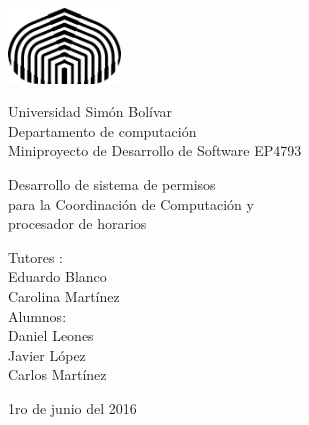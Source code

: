 \documentclass[]{article}
\begin{document}


\begin{titlepage}

\setlength{\hoffset}{-0.3in}
\setlength{\voffset}{-1in}
\setlength{\topmargin}{1.5cm}
\setlength{\headheight}{0.5cm}
\setlength{\headsep}{1cm}
\setlength{\oddsidemargin}{3cm}
\setlength{\evensidemargin}{3cm}
\setlength{\footskip}{1.5cm}
\enlargethispage{1cm}

\fontsize{12pt}{14pt}
\selectfont

\begin{center}

\includegraphics[height=2cm]{logo.png}

\vspace{0.5cm}

Universidad Sim\'on Bol\'ivar\\
Departamento de computaci\'on\\
Miniproyecto de Desarrollo de Software EP4793\\

\vspace{3.5cm}

\fontsize{17.28pt}{21pt}
\selectfont

Desarrollo de sistema de permisos \\
para la Coordinación de Computación y\\
procesador de horarios

\fontsize{12pt}{14pt}
\selectfont

\vspace{.6cm}



\vspace{.4cm}


\vspace{3cm}

Tutores : \\
Eduardo Blanco\\
Carolina Mart\'inez\\
\vspace{1cm}
Alumnos: \\
Daniel  Leones \\
Javier  L\'opez \\
Carlos Mart\'inez\\


\vspace{1cm}

1ro de junio del 2016

\end{center}
\end{titlepage}
\end{document}
